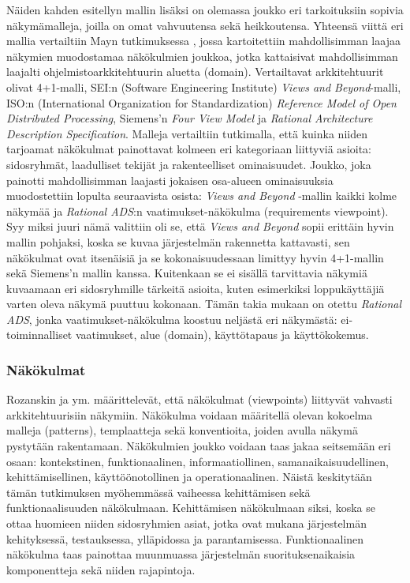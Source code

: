 \documentclass[finnish]{tktltiki2}
\theoremstyle{definition}
\theoremstyle{remark}
\begin{document}
Näiden kahden esitellyn mallin lisäksi on olemassa joukko eri tarkoituksiin sopivia näkymämalleja, joilla on omat vahvuutensa sekä heikkoutensa. Yhteensä viittä eri mallia vertailtiin Mayn tutkimuksessa \citep{may2005survey}, jossa kartoitettiin mahdollisimman laajaa näkymien muodostamaa näkökulmien joukkoa, jotka kattaisivat mahdollisimman laajalti ohjelmistoarkkitehtuurin aluetta (domain). Vertailtavat arkkitehtuurit olivat 4+1-malli, SEI:n (Software Engineering Institute) \textit{Views and Beyond}-malli, ISO:n (International Organization for Standardization) \textit{Reference Model of Open Distributed Processing}, Siemens'n \textit{Four View Model} ja \textit{Rational Architecture Description Specification}. Malleja vertailtiin tutkimalla, että kuinka niiden tarjoamat näkökulmat painottavat kolmeen eri kategoriaan liittyviä asioita: sidosryhmät, laadulliset tekijät ja rakenteelliset ominaisuudet. Joukko, joka painotti mahdollisimman laajasti jokaisen osa-alueen ominaisuuksia muodostettiin lopulta seuraavista osista: \textit{Views and Beyond} -mallin kaikki kolme näkymää ja \textit{Rational ADS}:n vaatimukset-näkökulma (requirements viewpoint). Syy miksi juuri nämä valittiin oli se, että \textit{Views and Beyond} sopii erittäin hyvin mallin pohjaksi, koska se kuvaa järjestelmän rakennetta kattavasti, sen näkökulmat ovat itsenäisiä ja se kokonaisuudessaan limittyy hyvin 4+1-mallin sekä Siemens'n mallin kanssa. Kuitenkaan se ei sisällä tarvittavia näkymiä kuvaamaan eri sidosryhmille tärkeitä asioita, kuten esimerkiksi loppukäyttäjiä varten oleva näkymä puuttuu kokonaan. Tämän takia mukaan on otettu \textit{Rational ADS}, jonka vaatimukset-näkökulma koostuu neljästä eri näkymästä: ei-toiminnalliset vaatimukset, alue (domain), käyttötapaus ja käyttökokemus. 



\subsubsection{Näkökulmat}
Rozanskin ja ym. \citep[s. 36-42]{Rozanski:2011:SSA:2072649} määrittelevät, että näkökulmat (viewpoints) liittyvät vahvasti arkkitehtuurisiin näkymiin. Näkökulma voidaan määritellä olevan kokoelma malleja (patterns), templaatteja sekä konventioita, joiden avulla näkymä pystytään rakentamaan.  Näkökulmien joukko voidaan taas jakaa seitsemään eri osaan: kontekstinen, funktionaalinen, informaatiollinen, samanaikaisuudellinen, kehittämisellinen, käyttöönotollinen ja operationaalinen. Näistä keskitytään tämän tutkimuksen myöhemmässä vaiheessa kehittämisen sekä funktionaalisuuden näkökulmaan. Kehittämisen näkökulmaan siksi, koska se ottaa huomieen niiden sidosryhmien asiat, jotka ovat mukana järjestelmän kehityksessä, testauksessa, ylläpidossa ja parantamisessa. Funktionaalinen näkökulma taas painottaa muunmuassa järjestelmän suorituksenaikaisia komponentteja sekä niiden rajapintoja.
\end{document}

